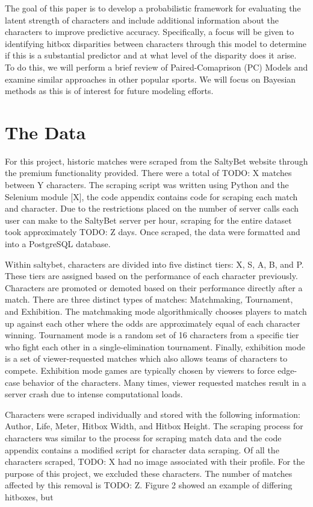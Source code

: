 \documentclass{article}
\begin{document}
The goal of this paper is to develop a probabilistic framework for evaluating the latent strength of characters and include additional information about the characters to improve predictive accuracy. Specifically, a focus will be given to identifying hitbox disparities between characters through this model to determine if this is a substantial predictor and at what level of the disparity does it arise. To do this, we will perform a brief review of Paired-Comaprison (PC) Models and examine similar approaches in other popular sports. We will focus on Bayesian methods as this is of interest for future modeling efforts. %

\section{The Data}

For this project, historic matches were scraped from the SaltyBet website through the premium functionality provided. There were a total of TODO: X matches between Y characters. The scraping script was written using Python and the Selenium module [X], the code appendix contains code for scraping each match and character. Due to the restrictions placed on the number of server calls each user can make to the SaltyBet server per hour, scraping for the entire dataset took approximately TODO: Z days. Once scraped, the data were formatted and into a PostgreSQL database. 

Within saltybet, characters are divided into five distinct tiers: X, S, A, B, and P. These tiers are assigned based on the performance of each character previously. Characters are promoted or demoted based on their performance directly after a match. There are three distinct types of matches: Matchmaking, Tournament, and Exhibition. The matchmaking mode algorithmically chooses players to match up against each other where the odds are approximately equal of each character winning. Tournament mode is a random set of 16 characters from a specific tier who fight each other in a single-elimination tournament. Finally, exhibition mode is a set of viewer-requested matches which also allows teams of characters to compete. Exhibition mode games are typically chosen by viewers to force edge-case behavior of the characters. Many times, viewer requested matches result in a server crash due to intense computational loads.

Characters were scraped individually and stored with the following information: Author, Life, Meter, Hitbox Width, and Hitbox Height. The scraping process for characters was similar to the process for scraping match data and the code appendix contains a modified script for character data scraping. Of all the characters scraped, TODO: X had no image associated with their profile. For the purpose of this project, we excluded these characters. The number of matches affected by this removal is TODO: Z. Figure 2 showed an example of differing hitboxes, but 
\end{document}
